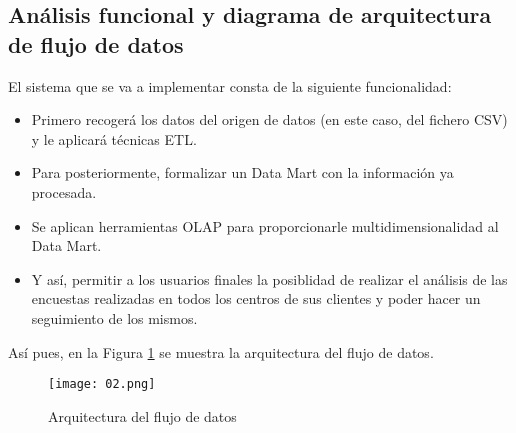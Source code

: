 \medskip
\subsection{Análisis funcional y diagrama de arquitectura de flujo de datos}
\label{02}
El sistema que se va a implementar consta de la siguiente funcionalidad:
\begin{itemize}
 \item Primero recogerá los datos del origen de datos (en este caso, del fichero CSV) y le aplicará técnicas ETL.
 \item Para posteriormente, formalizar un Data Mart con la información ya procesada.
 \item Se aplican herramientas OLAP para proporcionarle multidimensionalidad al Data Mart.
 \item Y así, permitir a los usuarios finales la posiblidad de realizar el análisis de las encuestas realizadas en todos los centros de sus clientes y poder hacer un seguimiento de los mismos.
\end{itemize}

Así pues, en la Figura \ref{02-image} se muestra la arquitectura del flujo de datos. 
\begin{figure}[!th]
\texttt{[image: 02.png]}
\centering
\caption{Arquitectura del flujo de datos}
\label{02-image}
\end{figure}
